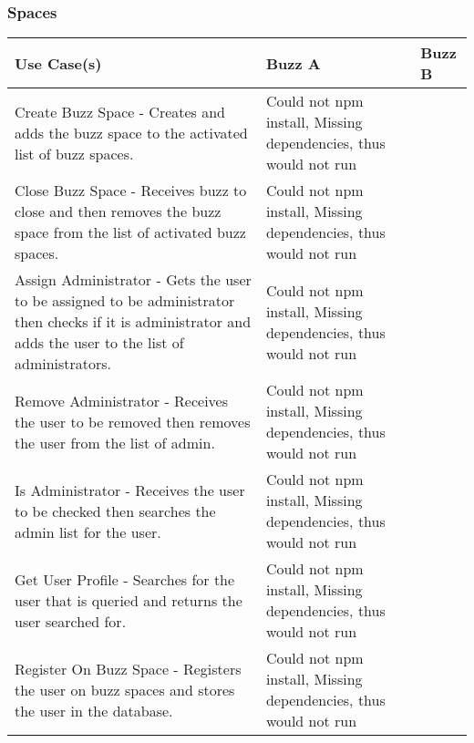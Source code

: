 \documentclass[12pt]{article}
\begin{document}
\subsubsection{Spaces}%
\begin{tabular}{|p{4.5cm}|p{4.5cm}|p{4.5cm}|}

\hline
Use Case(s) & Buzz A & Buzz B \\ 
\hline
Create Buzz Space - Creates and adds the buzz space to the activated list of buzz spaces. & Could not npm install, Missing dependencies, thus would not run &  \\ %
\hline
Close Buzz Space - Receives buzz to close and then removes the buzz space from the list of activated buzz spaces. & Could not npm install, Missing dependencies, thus would not run & \\ %
\hline
Assign Administrator - Gets the user to be assigned to be administrator then checks if it is administrator and adds the user to the list of administrators.  & Could not npm install, Missing dependencies, thus would not run & \\ %
\hline
Remove Administrator - Receives the user to be removed then removes the user from the list of admin. & Could not npm install, Missing dependencies, thus would not run &  \\ %
\hline
Is Administrator - Receives the user to be checked then searches the admin list for the user.  & Could not npm install, Missing dependencies, thus would not run &  \\ %
\hline
Get User Profile -  Searches for the user that is queried and returns the user searched for. & Could not npm install, Missing dependencies, thus would not run &  \\ %
\hline
Register On Buzz Space - Registers the user on buzz spaces and stores the user in the database. & Could not npm install, Missing dependencies, thus would not run &  \\ %
\hline


\end{tabular}
\end{document}
